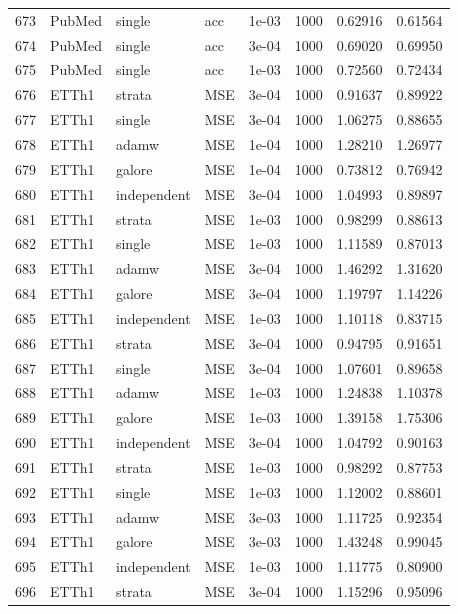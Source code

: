 \begin{longtable}{rlllrrrr}
673 & PubMed & single & acc & 1e-03 & 1000 & 0.62916 & 0.61564 \\
674 & PubMed & single & acc & 3e-04 & 1000 & 0.69020 & 0.69950 \\
675 & PubMed & single & acc & 1e-03 & 1000 & 0.72560 & 0.72434 \\
\rowcolor{oursbg}
676 & ETTh1 & strata & MSE & 3e-04 & 1000 & 0.91637 & 0.89922 \\
677 & ETTh1 & single & MSE & 3e-04 & 1000 & 1.06275 & 0.88655 \\
678 & ETTh1 & adamw & MSE & 1e-04 & 1000 & 1.28210 & 1.26977 \\
679 & ETTh1 & galore & MSE & 1e-04 & 1000 & 0.73812 & 0.76942 \\
680 & ETTh1 & independent & MSE & 3e-04 & 1000 & 1.04993 & 0.89897 \\
\rowcolor{oursbg}
681 & ETTh1 & strata & MSE & 1e-03 & 1000 & 0.98299 & 0.88613 \\
682 & ETTh1 & single & MSE & 1e-03 & 1000 & 1.11589 & 0.87013 \\
683 & ETTh1 & adamw & MSE & 3e-04 & 1000 & 1.46292 & 1.31620 \\
684 & ETTh1 & galore & MSE & 3e-04 & 1000 & 1.19797 & 1.14226 \\
685 & ETTh1 & independent & MSE & 1e-03 & 1000 & 1.10118 & 0.83715 \\
\rowcolor{oursbg}
686 & ETTh1 & strata & MSE & 3e-04 & 1000 & 0.94795 & 0.91651 \\
687 & ETTh1 & single & MSE & 3e-04 & 1000 & 1.07601 & 0.89658 \\
688 & ETTh1 & adamw & MSE & 1e-03 & 1000 & 1.24838 & 1.10378 \\
689 & ETTh1 & galore & MSE & 1e-03 & 1000 & 1.39158 & 1.75306 \\
690 & ETTh1 & independent & MSE & 3e-04 & 1000 & 1.04792 & 0.90163 \\
\rowcolor{oursbg}
691 & ETTh1 & strata & MSE & 1e-03 & 1000 & 0.98292 & 0.87753 \\
692 & ETTh1 & single & MSE & 1e-03 & 1000 & 1.12002 & 0.88601 \\
693 & ETTh1 & adamw & MSE & 3e-03 & 1000 & 1.11725 & 0.92354 \\
694 & ETTh1 & galore & MSE & 3e-03 & 1000 & 1.43248 & 0.99045 \\
695 & ETTh1 & independent & MSE & 1e-03 & 1000 & 1.11775 & 0.80900 \\
\rowcolor{oursbg}
696 & ETTh1 & strata & MSE & 3e-04 & 1000 & 1.15296 & 0.95096 \\

\end{longtable}
